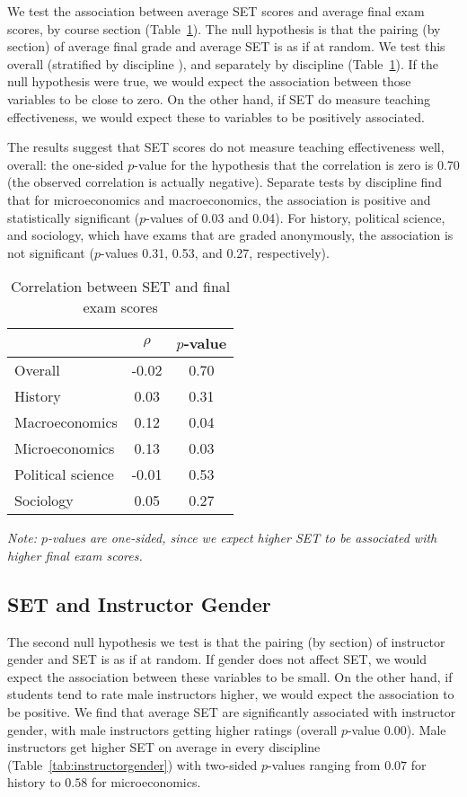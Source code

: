 \documentclass[12pt]{article}
\newcommand{\todo}[1]{{\color{red}{TO DO: \sc #1}}}
\begin{document}
We test the association between average SET scores and average final exam scores, by course
section (Table~\ref{tab:finalexam}). 
The null hypothesis is that the pairing (by section)
of average final grade and average SET is as if at random.
We test this overall (stratified by discipline \todo{check this!}), and separately
by discipline (Table~\ref{tab:finalexam}).
If the null hypothesis were true, we would expect the association between those variables to be 
close to zero.
On the other hand, if SET do measure teaching effectiveness, we would expect these to 
variables to be positively associated.

The results suggest that SET scores do not measure teaching effectiveness well, overall:
the one-sided $p$-value for the hypothesis that the correlation is zero is 0.70 (the
observed correlation is actually negative). 
Separate tests by discipline find that for microeconomics and macroeconomics, the 
association is positive and statistically
significant ($p$-values of 0.03 and 0.04). 
For history, political science, and sociology, which have exams that are graded anonymously,
the association is not significant ($p$-values 0.31, 0.53, and 0.27, respectively). 

\begin{table}[htbp]
  \centering
  \footnotesize 
  \caption{Correlation between SET and final exam scores}
    \begin{tabular}{lcc}
    \toprule 
                        & $\rho$  & $p$-value  \\
   \midrule
    Overall &            -0.02 &       0.70  \\
    History &             0.03 &       0.31  \\
    Macroeconomics &      0.12 &       0.04  \\
    Microeconomics &      0.13 &       0.03  \\
    Political science &  -0.01 &       0.53  \\
    Sociology &           0.05 &       0.27  \\
    \bottomrule
    \end{tabular}%
 \label{tab:finalexam}%
 
\textit{Note: $p$-values are one-sided, since we expect higher SET to be associated
with higher final exam scores.}
\end{table}%
\normalsize


\subsection{SET and Instructor Gender}
The second null hypothesis we test is that the pairing (by section) of 
instructor gender and SET is as if at random.
If gender does not affect SET, we would expect the association between these
variables to be small.
On the other hand, if students tend to rate male instructors higher, we would
expect the association to be positive.
We find that average SET are significantly associated with instructor gender, with male instructors
getting higher ratings (overall $p$-value 0.00). 
Male instructors get higher SET on average in every discipline  (Table~\ref{tab:instructorgender})
with two-sided $p$-values ranging from $0.07$ for history to $0.58$ for microeconomics.
\end{document}

